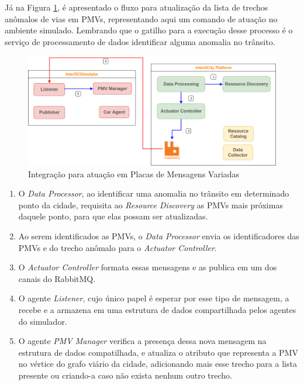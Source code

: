 Já na Figura \ref{fig:smart_traffic_actuation}, é apresentado o fluxo para atualização da lista de trechos anômalos de vias em PMVs, representando aqui um comando de atuação no
ambiente simulado.
Lembrando que o gatilho para a execução desse processo é o serviço de processamento de dados identificar alguma anomalia no trânsito.

\begin{figure}[ht]
	\centering
	\includegraphics[width=\textwidth]{figuras/integration-actuate-pmv.png}
	\caption{Integração para atuação em Placas de Mensagens Variadas}
	\label{fig:smart_traffic_actuation}
\end{figure}

\begin{enumerate}
    \item O \textit{Data Processor}, ao identificar uma anomalia no trânsito em determinado ponto da cidade, requisita ao \textit{Resource Discovery} as PMVs mais próximas
        daquele ponto, para que elas possam ser atualizadas.

    \item Ao serem identificados as PMVs, o \textit{Data Processor} envia os identificadores das PMVs e do trecho anômalo para o \textit{Actuator Controller}.

    \item O \textit{Actuator Controller} formata essas mensagens e as publica em um dos canais do RabbitMQ.

    \item O agente \textit{Listener}, cujo único papel é esperar por esse tipo de mensagem, a recebe e a armazena em uma estrutura de dados compartilhada pelos agentes do simulador.

    \item O agente \textit{PMV Manager} verifica a presença dessa nova mensagem na estrutura de dados compatilhada, e atualiza o atributo que representa a PMV no vértice do grafo
        viário da cidade, adicionando mais esse trecho para a lista presente ou criando-a caso não exista nenhum outro trecho.
\end{enumerate}

